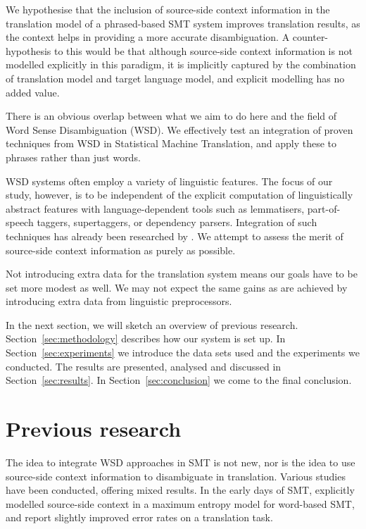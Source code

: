 We hypothesise that the inclusion of source-side context information in the
translation model of a phrased-based SMT system improves translation results,
as the context helps in providing a more accurate disambiguation. A
counter-hypothesis to this would be that although source-side context
information is not modelled explicitly in this paradigm, it is implicitly captured by the
combination of translation model and target language model, and explicit
modelling has no added value. 

There is an obvious overlap between what we aim to do here and the field of
Word Sense Disambiguation (WSD). We effectively test an integration of proven
techniques from WSD in Statistical Machine Translation, and apply these to
phrases rather than just words.

WSD systems often employ a variety of linguistic features. The focus of our
study, however, is to be independent of the explicit computation of
linguistically abstract features with language-dependent tools such as
lemmatisers, part-of-speech taggers, supertaggers, or dependency parsers.
Integration of such techniques has already been researched by \cite{Rejwanul+11}. 
We attempt to assess the merit of source-side context information as purely as possible.

Not introducing extra data for the translation system means our goals have to
be set more modest as well. We may not expect the same gains as are achieved by
introducing extra data from linguistic preprocessors.

In the next section, we will sketch an overview of previous research.
Section~\ref{sec:methodology} describes how our system is set up. In
Section~\ref{sec:experiments} we introduce the data sets used and the
experiments we conducted. The results are presented, analysed and
discussed in Section~\ref{sec:results}. In Section~\ref{sec:conclusion} we come
to the final conclusion.

\section{Previous research}

The idea to integrate WSD approaches in SMT is not new, nor is the idea to use
source-side context information to disambiguate in translation. Various studies
have been conducted, offering mixed results. In the early days of SMT,
\cite{GarciaVarea+02} explicitly modelled source-side context in a
maximum entropy model for word-based SMT, and report slightly improved error
rates on a translation task.

